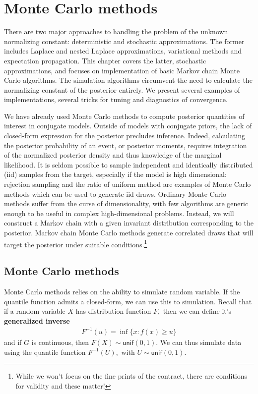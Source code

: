 \documentclass[
  11pt,
  letterpaper,
]{scrbook}
\theoremstyle{definition}
\theoremstyle{plain}
\theoremstyle{plain}
\theoremstyle{plain}
\theoremstyle{definition}
\theoremstyle{definition}
\theoremstyle{plain}
\theoremstyle{plain}
\theoremstyle{remark}
\begin{document}

\chapter{Monte Carlo methods}\label{monte-carlo-methods}

There are two major approaches to handling the problem of the unknown
normalizing constant: deterministic and stochastic approximations. The
former includes Laplace and nested Laplace approximations, variational
methods and expectation propagation. This chapter covers the latter,
stochastic approximations, and focuses on implementation of basic Markov
chain Monte Carlo algorithms. The simulation algorithms circumvent the
need to calculate the normalizing constant of the posterior entirely. We
present several examples of implementations, several tricks for tuning
and diagnostics of convergence.

We have already used Monte Carlo methods to compute posterior quantities
of interest in conjugate models. Outside of models with conjugate
priors, the lack of closed-form expression for the posterior precludes
inference. Indeed, calculating the posterior probability of an event, or
posterior moments, requires integration of the normalized posterior
density and thus knowledge of the marginal likelihood. It is seldom
possible to sample independent and identically distributed (iid) samples
from the target, especially if the model is high dimensional: rejection
sampling and the ratio of uniform method are examples of Monte Carlo
methods which can be used to generate iid draws. Ordinary Monte Carlo
methods suffer from the curse of dimensionality, with few algorithms are
generic enough to be useful in complex high-dimensional problems.
Instead, we will construct a Markov chain with a given invariant
distribution corresponding to the posterior. Markov chain Monte Carlo
methods generate correlated draws that will target the posterior under
suitable conditions.\footnote{While we won't focus on the fine prints of
  the contract, there are conditions for validity and these matter!}

\section{Monte Carlo methods}\label{monte-carlo-methods-1}

Monte Carlo methods relies on the ability to simulate random variable.
If the quantile function admits a closed-form, we can use this to
simulation. Recall that if a random variable \(X\) has distribution
function \(F,\) then we can define it's \textbf{generalized inverse}
\begin{align*}
F^{-1}(u) = \inf\{x: f(x) \geq u\}
\end{align*} and if \(G\) is continuous, then
\(F(X) \sim \mathsf{unif}(0,1).\) We can thus simulate data using the
quantile function \(F^{-1}(U),\) with \(U \sim \mathsf{unif}(0,1).\)
\end{document}
